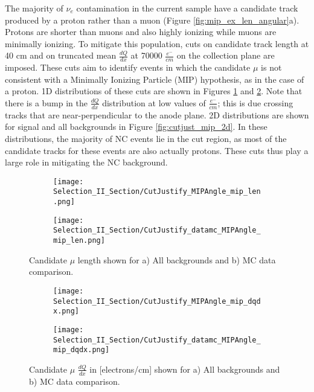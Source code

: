\par The majority of $\nu_e$ contamination in the current sample have a candidate track produced by a proton rather than a muon (Figure \ref{fig:mip_ex_len_angular}a). Protons are shorter than muons and also highly ionizing while muons are minimally ionizing. To mitigate this population, cuts on candidate track length at 40 cm and on truncated mean $\frac{dQ}{dx}$ at 70000 $\frac{e^-}{cm}$ on the collection plane are imposed. These cuts aim to identify events in which the candidate $\mu$ is not consistent with a Minimally Ionizing Particle (MIP) hypothesis, as in the case of a proton. 1D distributions of these cuts are shown in Figures \ref{fig:cutjust_sel2_multall_len} and \ref{fig:cutjust_sel2_multall_dqdx}. Note that there is a bump in the $\frac{dQ}{dx}$ distribution at low values of $\frac{e^-}{cm}$; this is due crossing tracks that are near-perpendicular to the anode plane.  2D distributions are shown for signal and all backgrounds in Figure \ref{fig:cutjust_mip_2d}.  In these distributions, the majority of NC events lie in the cut region, as most of the candidate tracks for these events are also actually protons. These cuts thus play a large role in mitigating the NC background.

\begin{figure}[h!]
  \begin{subfigure}[t]{0.35\textwidth}
\texttt{[image: Selection\_II\_Section/CutJustify\_MIPAngle\_mip\_len.png]}
    \caption{ }
  \end{subfigure} 
  \hspace{20mm}
  \begin{subfigure}[t]{0.35\textwidth}
\texttt{[image: Selection\_II\_Section/CutJustify\_datamc\_MIPAngle\_mip\_len.png]}
    \caption{ }
  \end{subfigure} 

\caption{ Candidate $\mu$ length shown for a) All backgrounds and b) MC data comparison. }
\label{fig:cutjust_sel2_multall_len}
\end{figure}


\begin{figure}[H]
  \begin{subfigure}[t]{0.35\textwidth}
\texttt{[image: Selection\_II\_Section/CutJustify\_MIPAngle\_mip\_dqdx.png]}
    \caption{ }
  \end{subfigure} 
  \hspace{20mm}
  \begin{subfigure}[t]{0.35\textwidth}
\texttt{[image: Selection\_II\_Section/CutJustify\_datamc\_MIPAngle\_mip\_dqdx.png]}
    \caption{ }
  \end{subfigure} 
\caption{ Candidate $\mu$ $\frac{dQ}{dx}$ in [electrons/cm] shown for a) All backgrounds and b) MC data comparison. }
\label{fig:cutjust_sel2_multall_dqdx}
\end{figure}


